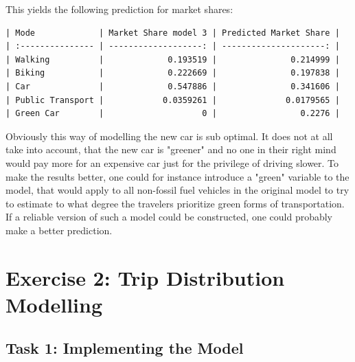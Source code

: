 \documentclass[a4paper,12pt]{article}
\begin{document}
This yields the following prediction for market shares:

\begin{verbatim}
| Mode             | Market Share model 3 | Predicted Market Share |
| :--------------- | -------------------: | ---------------------: |
| Walking          |             0.193519 |               0.214999 |
| Biking           |             0.222669 |               0.197838 |
| Car              |             0.547886 |               0.341606 |
| Public Transport |            0.0359261 |              0.0179565 |
| Green Car        |                    0 |                 0.2276 |
\end{verbatim}

Obviously this way of modelling the new car is sub optimal. It does not at all take into account, that the new car is "greener" and no one in their right mind would pay more for an expensive car just for the privilege of driving slower. 
To make the results better, one could for instance introduce a "green" variable to the model, that would apply to all non-fossil fuel vehicles in the original model to try to estimate to what degree the travelers prioritize green forms of transportation. If a reliable version of such a model could be constructed, one could probably make a better prediction.

\section{Exercise 2: Trip Distribution Modelling}

\subsection{Task 1: Implementing the Model}
\end{document}

